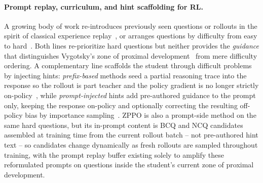 \paragraph{Prompt replay, curriculum, and hint scaffolding for RL.}
A growing body of work re-introduces previously seen questions or rollouts in the spirit of classical experience replay~\citep{zhan2025exgrpo,zhang2025rlep,li2025repo,li2026dyjr,baroian2026prompt}, or arranges questions by difficulty from easy to hard~\citep{zhang2025clpo,mahrooghi2026goldilocks}. Both lines re-prioritize hard questions but neither provides the \emph{guidance} that distinguishes Vygotsky's zone of proximal development~\citep{vygotsky1978mind} from mere difficulty ordering. A complementary line scaffolds the student through difficult problems by injecting hints: \emph{prefix-based} methods seed a partial reasoning trace into the response so the rollout is part teacher and the policy gradient is no longer strictly on-policy~\citep{zhang2025stephint,zhang2025bread,liu2026palign}, while \emph{prompt-injected} hints add pre-authored guidance to the prompt only, keeping the response on-policy and optionally correcting the resulting off-policy bias by importance sampling~\citep{li2025staying,nath2025adaptive}. ZPPO is also a prompt-side method on the same hard questions, but its in-prompt content is BCQ and NCQ candidates assembled at training time from the current rollout batch -- not pre-authored hint text -- so candidates change dynamically as fresh rollouts are sampled throughout training, with the prompt replay buffer existing solely to amplify these reformulated prompts on questions inside the student's current zone of proximal development.
